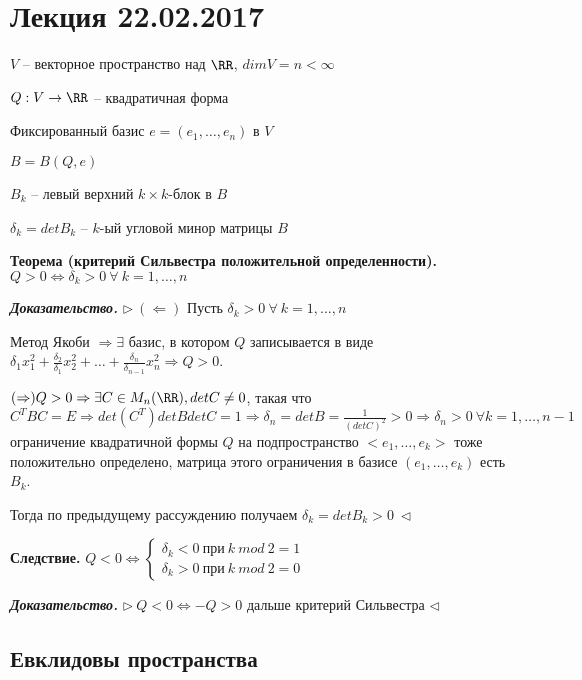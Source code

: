 \section{Лекция 22.02.2017}

$V$ -- векторное пространство над $\RR$, $dimV = n < \infty$

$Q: V \rightarrow \RR$ -- квадратичная форма

Фиксированный базис $e = (e_1, \dots, e_n)$ в $V$

$B = B(Q, e)$

$B_k$ -- левый верхний $k \times k$-блок в $B$

$\delta_k = det B_k$ -- $k$-ый угловой минор матрицы $B$

\bigskip
\textbf{Теорема (критерий Сильвестра положительной определенности).} $Q > 0 \Leftrightarrow \delta_k > 0 \ \forall \ k = 1, \dots, n$

\bigskip
\textbf{\textit{Доказательство.}} $\rhd \ (\Leftarrow)$ Пусть $\delta_k > 0 \ \forall \ k = 1, \dots, n$

Метод Якоби $\Rightarrow \exists$ базис, в котором $Q$ записывается в виде $\delta_1 x_1^2 + \frac{\delta_2}{\delta_1} x_2^2 + \dots + \frac{\delta_n}{\delta_{n-1}} x_n^2 \Rightarrow Q > 0$.

$(\Rightarrow) Q > 0 \Rightarrow \exists C \in M_n(\RR), detC \neq 0$, такая что $C^T B C = E \Rightarrow det(C^T) det B det C = 1 \Rightarrow \delta_n = det B = \frac{1}{(det C)^2} > 0 \Rightarrow \delta_n > 0 \ \forall k = 1, \dots, n-1$ ограничение квадратичной формы $Q$ на подпространство $<e_1, \dots, e_k>$ тоже положительно определено, матрица этого ограничения в базисе $(e_1, \dots, e_k)$ есть $B_k$.

Тогда по предыдущему рассуждению получаем $\delta_k = det B_k > 0 \ \lhd$

\bigskip
\textbf{Следствие.} $Q < 0 \Leftrightarrow \begin{cases} \delta_k < 0 \ при \ k \ mod \ 2 = 1 \\
\delta_k > 0 \ при \ k \ mod \ 2 = 0 \end{cases}$

\bigskip
\textbf{\textit{Доказательство.}} $\rhd \ Q < 0 \Leftrightarrow - Q > 0$ дальше критерий Сильвестра $\lhd$  

\bigskip
\subsection{Евклидовы пространства}

